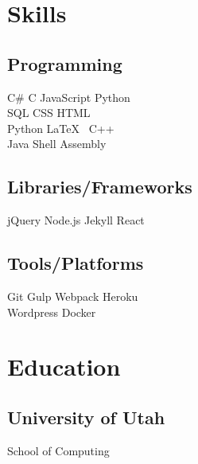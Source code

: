 \documentclass[]{PlushCV}
\begin{document}
\begin{minipage}[t]{0.25\textwidth}


\section{Skills}
\subsection{Programming}
\sectionsep
{}
C\# \textbullet{} C \textbullet{} JavaScript \textbullet{} Python    \\ SQL \textbullet{} CSS \textbullet{} HTML \textbullet{} \\
\sectionsep
{}
Python \textbullet{} \LaTeX\ \textbullet{}  C++  \\
\sectionsep
{}
Java \textbullet{}  Shell \textbullet{} Assembly \\
\sectionsep
\sectionsep
\subsection{Libraries/Frameworks}
\sectionsep
jQuery \textbullet{} Node.js \textbullet{} Jekyll \textbullet{} React \\
\sectionsep
\sectionsep
\subsection{Tools/Platforms}
\sectionsep
Git \textbullet{} Gulp \textbullet{} Webpack \textbullet{} Heroku    \\ Wordpress \textbullet{} Docker \\

\sectionsep


\section{Education}
\subsection{University of Utah}
School of Computing \\


\end{minipage}
\end{document}
